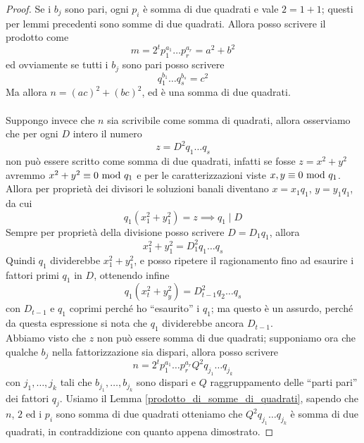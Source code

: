 \begin{proof}
	Se i $b_j$ sono pari, ogni $p_i$ è somma di due quadrati e vale $2=1+1$; questi per lemmi precedenti sono somme di due quadrati. Allora posso scrivere il prodotto come
	\begin{equation*}
	m=2^tp_1^{a_1}\dots p_r^{a_r}=a^2+b^2
	\end{equation*}
	ed ovviamente se tutti i $b_j$ sono pari posso scrivere
	\begin{equation*}
	q_1^{b_1}\dots q_s^{b_s}=c^2
	\end{equation*}
	Ma allora $n=(ac)^2+(bc)^2$, ed è una somma di due quadrati. \\ \\ Suppongo invece che $n$ sia scrivibile come somma di quadrati, allora osserviamo che per ogni $D$ intero il numero
	\begin{equation*}
	z=D^2q_1\dots q_s
	\end{equation*}
	non può essere scritto come somma di due quadrati, infatti se fosse $z=x^2+y^2$ avremmo $x^2+y^2\equiv0\ \mathrm{mod}\ q_1$ e per le caratterizzazioni viste $x,y\equiv0\ \mathrm{mod}\ q_1$. Allora per proprietà dei divisori le soluzioni banali diventano $x=x_1q_1$, $y=y_1q_1$, da cui
	\begin{equation*}
	q_1(x_1^2+y_1^2)=z \implies q_1\mid D
	\end{equation*}
	Sempre per proprietà della divisione posso scrivere $D=D_1q_1$, allora
	\begin{equation*}
	x_1^2+y_1^2=D_1^2q_1\dots q_s
	\end{equation*}
	Quindi $q_1$ dividerebbe $x_1^2+y_1^2$, e posso ripetere il ragionamento fino ad esaurire i fattori primi $q_1$ in $D$, ottenendo infine
	\begin{equation*}
	q_1(x_t^2+y_y^2)=D_{t-1}^2q_2\dots q_s
	\end{equation*}
	con $D_{t-1}$ e $q_1$ coprimi perché ho \enquote{esaurito} i $q_1$; ma questo è un assurdo, perché da questa espressione si nota che $q_1$ dividerebbe ancora $D_{t-1}$.
	\\ Abbiamo visto che $z$ non può essere somma di due quadrati; supponiamo ora che qualche $b_j$ nella fattorizzazione sia dispari, allora posso scrivere
	\begin{equation*}
	n=2^tp_1^{a_1}\dots p_r^{a_r}Q^2q_{j_1}\dots q_{j_k}
	\end{equation*}
	con ${j_1},\dots,{j_k}$ tali che $b_{j_1},\dots,b_{j_k}$ sono dispari e $Q$ raggruppamento delle \enquote{parti pari} dei fattori $q_j$.
	Usiamo il Lemma \ref{prodotto_di_somme_di_quadrati}, sapendo che $n$, $2$ ed i $p_i$ sono somma di due quadrati otteniamo che $Q^2q_{j_1}\dots q_{j_k}$ è somma di due quadrati, in contraddizione con quanto appena dimostrato.
\end{proof}




